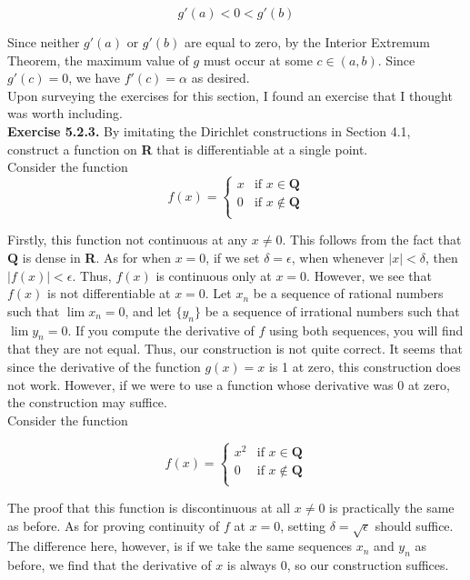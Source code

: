\documentclass[12pt, letterpaper, twoside]{article}
\begin{document}
$$
    g'(a) < 0 < g'(b)
$$

Since neither $g'(a)$ or $g'(b)$ are equal to zero, by the Interior Extremum Theorem, the maximum value of $g$ must occur at some $c \in (a, b)$. Since $g'(c) = 0$, we have $f'(c) = \alpha$ as desired. \\

Upon surveying the exercises for this section, I found an exercise that I thought was worth including. \\

\textbf{ Exercise 5.2.3.} By imitating the Dirichlet constructions in Section 4.1, construct
a function on \textbf{R} that is differentiable at a single point. \\

Consider the function 
\[
 f(x) =
  \begin{cases}
                                   x & \text{if $x \in \textbf{Q}$} \\
                                   0 & \text{if $x \not \in \textbf{Q}$} \\

  \end{cases}
\]

Firstly, this function not continuous at any $x \neq 0$. This follows from the fact that $\textbf{Q}$ is dense in \textbf{R}. As for when $x = 0$, if we set $\delta = \epsilon$, when whenever $| x | < \delta$, then $|f(x)| < \epsilon$. Thus, $f(x)$ is continuous only at $x = 0$. However, we see that $f(x)$ is not differentiable at $x = 0$. Let $x_n$ be a sequence of rational numbers such that $\lim x_n = 0$, and let $\{y_n\}$ be a sequence of irrational numbers such that $\lim y_n = 0$. If you compute the derivative of $f$ using both sequences, you will find that they are not equal. Thus, our construction is not quite correct. It seems that since the derivative of the function $g(x) = x$ is 1 at zero, this construction does not work. However, if we were to use a function whose derivative was 0 at zero, the construction may suffice. \\

Consider the function 

\[
 f(x) =
  \begin{cases}
                                   x^2 & \text{if $x \in \textbf{Q}$} \\
                                   0 & \text{if $x \not \in \textbf{Q}$} \\

  \end{cases}
\]

The proof that this function is discontinuous at all $x \neq 0$ is practically the same as before. As for proving continuity of $f$ at $x = 0$, setting $\delta = \sqrt{\epsilon}$ should suffice. The difference here, however, is if we take the same sequences $x_n$ and $y_n$ as before, we find that the derivative of $x$ is always $0$, so our construction suffices. 
\end{document}
